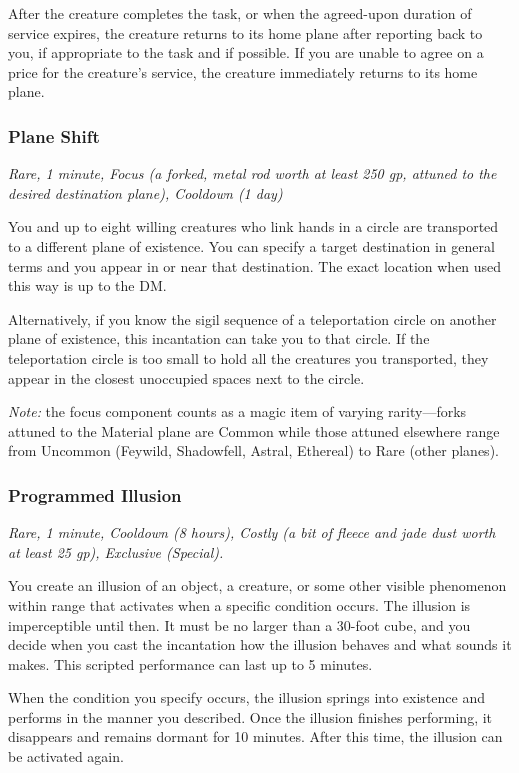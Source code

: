 After the creature completes the task, or when the agreed-upon duration of service expires, the creature returns to its home plane after reporting back to you, if appropriate to the task and if possible. If you are unable to agree on a price for the creature's service, the creature immediately returns to its home plane.

\subsubsection{Plane Shift}
\textit{Rare, 1 minute, Focus (a forked, metal rod worth at least 250 gp, attuned to the desired destination plane), Cooldown (1 day)}

You and up to eight willing creatures who link hands in a circle are transported to a different plane of existence. You can specify a target destination in general terms and you appear in or near that destination. The exact location when used this way is up to the DM.

Alternatively, if you know the sigil sequence of a teleportation circle on another plane of existence, this incantation can take you to that circle. If the teleportation circle is too small to hold all the creatures you transported, they appear in the closest unoccupied spaces next to the circle.

\textit{Note:} the focus component counts as a magic item of varying rarity---forks attuned to the Material plane are Common while those attuned elsewhere range from Uncommon (Feywild, Shadowfell, Astral, Ethereal) to Rare (other planes).

\subsubsection{Programmed Illusion}
\textit{Rare, 1 minute, Cooldown (8 hours), Costly (a bit of fleece and jade dust worth at least 25 gp), Exclusive (Special).}

You create an illusion of an object, a creature, or some other visible phenomenon within range that activates when a specific condition occurs. The illusion is imperceptible until then. It must be no larger than a 30-foot cube, and you decide when you cast the incantation how the illusion behaves and what sounds it makes. This scripted performance can last up to 5 minutes.

When the condition you specify occurs, the illusion springs into existence and performs in the manner you described. Once the illusion finishes performing, it disappears and remains dormant for 10 minutes. After this time, the illusion can be activated again.

